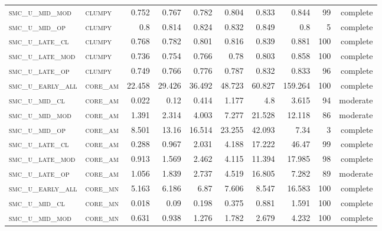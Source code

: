 \begin{landscape}
\begin{center}
\begin{footnotesize}
\begin{longtable}{llrrrrr|rrr}
\textsc{smc\_u\_mid\_mod  } & \textsc{clumpy    }   & 0.752    & 0.767    & 0.782    & 0.804    & 0.833    & 0.844    & 99  & complete \\
\textsc{smc\_u\_mid\_op   } & \textsc{clumpy    }   & 0.8      & 0.814    & 0.824    & 0.832    & 0.849    & 0.8      & 5   & complete \\
\textsc{smc\_u\_late\_cl  } & \textsc{clumpy    }   & 0.768    & 0.782    & 0.801    & 0.816    & 0.839    & 0.881    & 100 & complete \\
\textsc{smc\_u\_late\_mod } & \textsc{clumpy    }   & 0.736    & 0.754    & 0.766    & 0.78     & 0.803    & 0.858    & 100 & complete \\
\textsc{smc\_u\_late\_op  } & \textsc{clumpy    }   & 0.749    & 0.766    & 0.776    & 0.787    & 0.832    & 0.833    & 96  & complete \\
\textsc{smc\_u\_early\_all} & \textsc{core\_am  }   & 22.458   & 29.426   & 36.492   & 48.723   & 60.827   & 159.264  & 100 & complete \\
\textsc{smc\_u\_mid\_cl   } & \textsc{core\_am  }   & 0.022    & 0.12     & 0.414    & 1.177    & 4.8      & 3.615    & 94  & moderate \\
\textsc{smc\_u\_mid\_mod  } & \textsc{core\_am  }   & 1.391    & 2.314    & 4.003    & 7.277    & 21.528   & 12.118   & 86  & moderate \\
\textsc{smc\_u\_mid\_op   } & \textsc{core\_am  }   & 8.501    & 13.16    & 16.514   & 23.255   & 42.093   & 7.34     & 3   & complete \\
\textsc{smc\_u\_late\_cl  } & \textsc{core\_am  }   & 0.288    & 0.967    & 2.031    & 4.188    & 17.222   & 46.47    & 99  & complete \\
\textsc{smc\_u\_late\_mod } & \textsc{core\_am  }   & 0.913    & 1.569    & 2.462    & 4.115    & 11.394   & 17.985   & 98  & complete \\
\textsc{smc\_u\_late\_op  } & \textsc{core\_am  }   & 1.056    & 1.839    & 2.737    & 4.519    & 16.805   & 7.282    & 89  & moderate \\
\textsc{smc\_u\_early\_all} & \textsc{core\_mn  }   & 5.163    & 6.186    & 6.87     & 7.606    & 8.547    & 16.583   & 100 & complete \\
\textsc{smc\_u\_mid\_cl   } & \textsc{core\_mn  }   & 0.018    & 0.09     & 0.198    & 0.375    & 0.881    & 1.591    & 100 & complete \\
\textsc{smc\_u\_mid\_mod  } & \textsc{core\_mn  }   & 0.631    & 0.938    & 1.276    & 1.782    & 2.679    & 4.232    & 100 & complete \\

\end{longtable}
\end{footnotesize}
\end{center}
\end{landscape}
